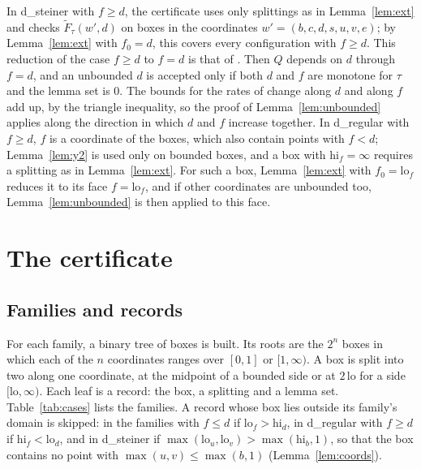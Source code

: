 \documentclass[11pt]{amsart}
\theoremstyle{definition}
\theoremstyle{remark}
\numberwithin{equation}{section}
\begin{document}
In d\_steiner with $f\ge d$, the certificate uses only splittings as in Lemma~\ref{lem:ext} and checks $\tilde F_\tau(w',d)$ on boxes in the coordinates $w'=(b,c,d,s,u,v,e)$; by Lemma~\ref{lem:ext} with $f_0=d$, this covers every configuration with $f\ge d$. This reduction of the case $f\ge d$ to $f=d$ is that of \cite[Appendix~H.5]{KHSHGW}. Then $Q$ depends on $d$ through $f=d$, and an unbounded $d$ is accepted only if both $d$ and $f$ are monotone for $\tau$ and the lemma set is $0$. The bounds for the rates of change along $d$ and along $f$ add up, by the triangle inequality, so the proof of Lemma~\ref{lem:unbounded} applies along the direction in which $d$ and $f$ increase together. In d\_regular with $f\ge d$, $f$ is a coordinate of the boxes, which also contain points with $f<d$; Lemma~\ref{lem:y2} is used only on bounded boxes, and a box with $\mathrm{hi}_f=\infty$ requires a splitting as in Lemma~\ref{lem:ext}. For such a box, Lemma~\ref{lem:ext} with $f_0=\mathrm{lo}_f$ reduces it to its face $f=\mathrm{lo}_f$, and if other coordinates are unbounded too, Lemma~\ref{lem:unbounded} is then applied to this face.

\section{The certificate}\label{sec:cert}

\subsection{Families and records}\label{sec:families}
For each family, a binary tree of boxes is built. Its roots are the $2^n$ boxes in which each of the $n$ coordinates ranges over $[0,1]$ or $[1,\infty)$. A box is split into two along one coordinate, at the midpoint of a bounded side or at $2\,\mathrm{lo}$ for a side $[\mathrm{lo},\infty)$. Each leaf is a record: the box, a splitting and a lemma set. Table~\ref{tab:cases} lists the families. A record whose box lies outside its family's domain is skipped: in the families with $f\le d$ if $\mathrm{lo}_f>\mathrm{hi}_d$, in d\_regular with $f\ge d$ if $\mathrm{hi}_f<\mathrm{lo}_d$, and in d\_steiner if $\max(\mathrm{lo}_u,\mathrm{lo}_v)>\max(\mathrm{hi}_b,1)$, so that the box contains no point with $\max(u,v)\le\max(b,1)$ (Lemma~\ref{lem:coords}).
\end{document}
